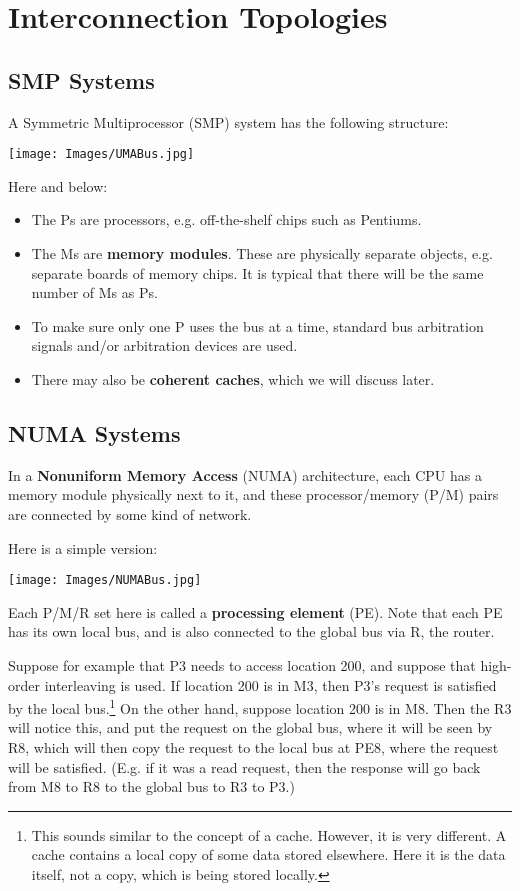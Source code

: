 \section{Interconnection Topologies}

\subsection{SMP Systems}

A Symmetric Multiprocessor (SMP) system has the following structure:

\texttt{[image: Images/UMABus.jpg]}

Here and below:

\begin{itemize}

\item The Ps are processors, e.g. off-the-shelf chips such as Pentiums.

\item The Ms are \textbf{memory modules}. These are physically separate
objects, e.g. separate boards of memory chips.  It is typical that there
will be the same number of Ms as Ps.

\item To make sure only one P uses the bus at a time, standard bus
arbitration signals and/or arbitration devices are used.

\item There may also be \textbf{coherent caches}, which we will discuss later.

\end{itemize}

\subsection{NUMA Systems}

In a {\bf Nonuniform Memory Access} (NUMA) architecture, each CPU has a
memory module physically next to it, and these processor/memory (P/M)
pairs are connected by some kind of network.

Here is a simple version:

\texttt{[image: Images/NUMABus.jpg]}

Each P/M/R set here is called a \textbf{processing element} (PE). Note
that each PE has its own local bus, and is also connected to the global
bus via R, the router.

Suppose for example that P3 needs to access location 200, and suppose
that high-order interleaving is used.  If location 200 is in M3, then
P3's request is satisfied by the local bus.\footnote{This sounds similar
to the concept of a cache. However, it is very different.  A cache
contains a local copy of some data stored elsewhere.  Here it is the
data itself, not a copy, which is being stored locally.} On the other
hand, suppose location 200 is in M8. Then the R3 will notice this, and
put the request on the global bus, where it will be seen by R8, which
will then copy the request to the local bus at PE8, where the request
will be satisfied.  (E.g. if it was a read request, then the response
will go back from M8 to R8 to the global bus to R3 to P3.)


